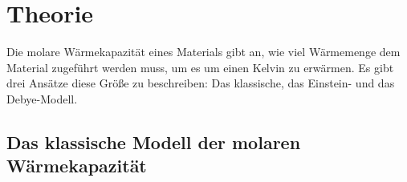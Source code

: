 \section{Theorie}
\label{sec:Theorie}



Die molare Wärmekapazität eines Materials gibt an, wie viel Wärmemenge dem Material zugeführt werden muss, um es um einen Kelvin zu erwärmen.
Es gibt drei Ansätze diese Größe zu beschreiben: Das klassische, das Einstein- und das Debye-Modell.

\subsection{Das klassische Modell der molaren Wärmekapazität}

